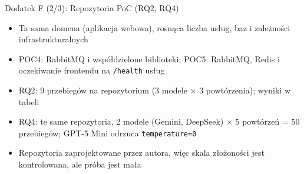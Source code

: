 \documentclass[aspectratio=169]{beamer}
\begin{document}
\begin{frame}{Dodatek F (2/3): Repozytoria PoC (RQ2, RQ4)}
    \renewcommand{\arraystretch}{1.1}
    \vspace{0.6em}
    \begin{itemize}
        \item Ta sama domena (aplikacja webowa), rosnąca liczba usług, baz i zależności infrastrukturalnych
        \item POC4: RabbitMQ i współdzielone biblioteki; POC5: RabbitMQ, Redis i oczekiwanie frontendu na \texttt{/health} usług
        \item RQ2: 9 przebiegów na repozytorium (3 modele $\times$ 3 powtórzenia); wyniki w tabeli
        \item RQ4: te same repozytoria, 2 modele (Gemini, DeepSeek) $\times$ 5 powtórzeń = 50 przebiegów; GPT-5 Mini odrzuca \texttt{temperature=0}
        \item Repozytoria zaprojektowane przez autora, więc skala złożoności jest kontrolowana, ale próba jest mała
    \end{itemize}
\end{frame}
\end{document}

